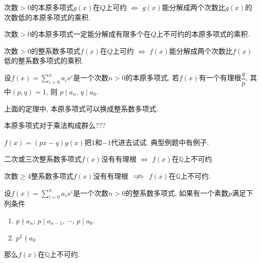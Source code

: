 \begin{Proposition}
次数$>0$的本原多项式$g(x)$在$Q$上可约 $\iff$ $g(x)$能分解成两个次数比$g(x)$的次数低的本原多项式的乘积.
\end{Proposition}

\begin{Corollary}
次数$>0$的本原多项式一定能分解成有限多个在$Q$上不可约的本原多项式的乘积.
\end{Corollary}

\begin{Corollary}
次数$>0$的整系数多项式$f(x)$在$Q$上可约 $\iff$ $f(x)$能分解成两个次数比$f(x)$低的整系数多项式的乘积.
\end{Corollary}

\begin{Theorem}
设$f(x) = \sum\limits_{i=0}^n a_i x^i$是一个次数$n > 0$的本原多项式, 若$f(x)$有一个有理根$\dfrac{q}{p}$, 其中$(p, q) = 1$, 则
$p \mid a_n$, $q \mid a_0$.
\end{Theorem}

\begin{Note}
上面的定理中, 本原多项式可以换成整系数多项式.
\end{Note}

\begin{Thoughts}
本原多项式对于乘法构成群么???
\end{Thoughts}

\begin{Thoughts}
$f(x) = (px - q) g(x)$把$1$和$-1$代进去试试. 典型例题中有例子.
\end{Thoughts}

\begin{Note}
二次或三次整系数多项式$f(x)$没有有理根 $\iff$ $f(x)$在$\mathbb{Q}$上不可约.
\end{Note}

\begin{Note}
次数$\ge 4$整系数多项式$f(x)$没有有理根 $\centernot\implies$ $f(x)$在$\mathbb{Q}$上不可约.
\end{Note}

\begin{Theorem}[Eisenstein判别法]
设$f(x) = \sum\limits_{i=0}^n a_i x^i$是一个次数$n > 0$的整系数多项式, 如果有一个素数$p$满足下列条件
\begin{enumerate}[(1)]
\item $p \nmid a_n$; $p \mid a_{n-1}$, $\cdots$, $p \mid a_0$.
\item $p^2 \nmid a_0$
\end{enumerate}
那么$f(x)$在$\mathbb{Q}$上不可约.
\end{Theorem}

